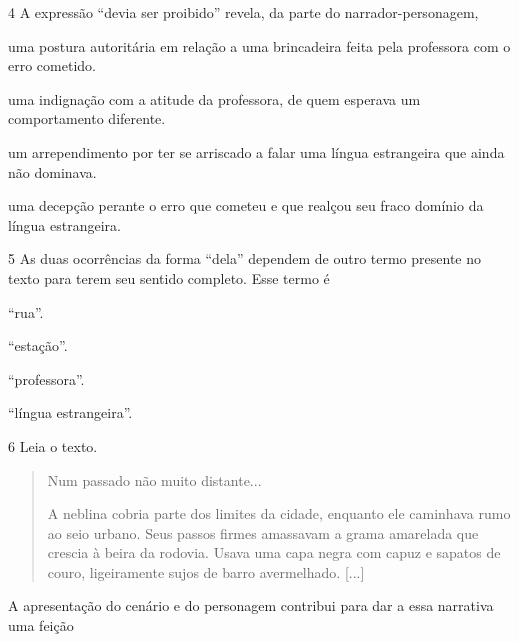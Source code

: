 
\num{4} A expressão ``devia ser proibido'' revela, da parte do
narrador-personagem,

\begin{escolha}
\item uma postura autoritária em relação a uma brincadeira feita pela
professora com o erro cometido.

\item uma indignação com a atitude da professora, de quem esperava um
comportamento diferente.

\item um arrependimento por ter se arriscado a falar uma língua estrangeira
que ainda não dominava.

\item uma decepção perante o erro que cometeu e que realçou seu fraco
domínio da língua estrangeira.
\end{escolha}

\num{5} As duas ocorrências da forma ``dela'' dependem de outro
termo presente no texto para terem seu sentido completo. Esse termo é

\begin{escolha}
\item ``rua''.

\item ``estação''.

\item ``professora''.

\item ``língua estrangeira''.
\end{escolha}

\num{6} Leia o texto.

\begin{quote}
Num passado não muito distante...

A neblina cobria parte dos limites da cidade, enquanto ele caminhava
rumo ao seio urbano. Seus passos firmes amassavam a grama amarelada que
crescia à beira da rodovia. Usava uma capa negra com capuz e sapatos de
couro, ligeiramente sujos de barro avermelhado. {[}...{]}

\end{quote}

A apresentação do cenário e do personagem contribui para dar a essa
narrativa uma feição

